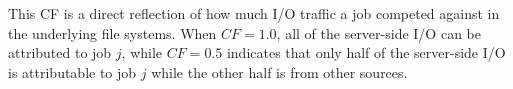 This CF is a direct reflection of how much I/O traffic a job competed against in the underlying file systems.
When $\mathit{CF} = 1.0$, all of the server-side I/O can be attributed to job $j$, while $\mathit{CF} = 0.5$ indicates that only half of the server-side I/O is attributable to job $j$ while the other half is from other sources.



